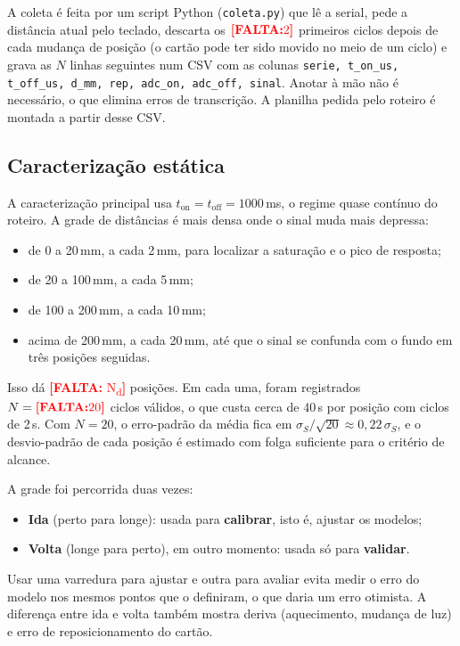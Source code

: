 \documentclass[11pt,a4paper]{article}
\newcommand{\pendente}[1]{\textcolor{red}{\textbf{[FALTA:} #1\textbf{]}}}
\begin{document}
A coleta é feita por um script Python (\texttt{coleta.py}) que lê a serial, pede a distância atual pelo teclado, descarta os $\pendente{2}$ primeiros ciclos depois de cada mudança de posição (o cartão pode ter sido movido no meio de um ciclo) e grava as $N$ linhas seguintes num CSV com as colunas \texttt{serie, t\_on\_us, t\_off\_us, d\_mm, rep, adc\_on, adc\_off, sinal}. Anotar à mão não é necessário, o que elimina erros de transcrição. A planilha pedida pelo roteiro é montada a partir desse CSV.

\subsection{Caracterização estática}
\label{sec:met-caracterizacao}

A caracterização principal usa $t_\text{on} = t_\text{off} = 1000$\,ms, o regime quase contínuo do roteiro. A grade de distâncias é mais densa onde o sinal muda mais depressa:
\begin{itemize}[nosep]
  \item de 0 a 20\,mm, a cada 2\,mm, para localizar a saturação e o pico de resposta;
  \item de 20 a 100\,mm, a cada 5\,mm;
  \item de 100 a 200\,mm, a cada 10\,mm;
  \item acima de 200\,mm, a cada 20\,mm, até que o sinal se confunda com o fundo em três posições seguidas.
\end{itemize}
Isso dá \pendente{N\textsubscript{d}} posições. Em cada uma, foram registrados $N = \pendente{20}$ ciclos válidos, o que custa cerca de 40\,s por posição com ciclos de 2\,s. Com $N = 20$, o erro-padrão da média fica em $\sigma_S/\sqrt{20} \approx 0{,}22\,\sigma_S$, e o desvio-padrão de cada posição é estimado com folga suficiente para o critério de alcance.

A grade foi percorrida duas vezes:
\begin{itemize}[nosep]
  \item \textbf{Ida} (perto para longe): usada para \textbf{calibrar}, isto é, ajustar os modelos;
  \item \textbf{Volta} (longe para perto), em outro momento: usada só para \textbf{validar}.
\end{itemize}
Usar uma varredura para ajustar e outra para avaliar evita medir o erro do modelo nos mesmos pontos que o definiram, o que daria um erro otimista. A diferença entre ida e volta também mostra deriva (aquecimento, mudança de luz) e erro de reposicionamento do cartão.
\end{document}
